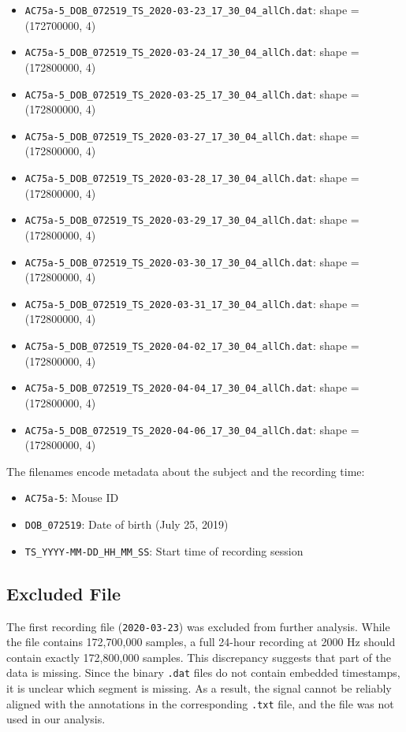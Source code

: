 \documentclass{article}
\begin{document}
	\begin{itemize}
		\item \texttt{AC75a-5\_DOB\_072519\_TS\_2020-03-23\_17\_30\_04\_allCh.dat}: shape = (172700000, 4)
		\item \texttt{AC75a-5\_DOB\_072519\_TS\_2020-03-24\_17\_30\_04\_allCh.dat}: shape = (172800000, 4)
		\item \texttt{AC75a-5\_DOB\_072519\_TS\_2020-03-25\_17\_30\_04\_allCh.dat}: shape = (172800000, 4)
		\item \texttt{AC75a-5\_DOB\_072519\_TS\_2020-03-27\_17\_30\_04\_allCh.dat}: shape = (172800000, 4)
		\item \texttt{AC75a-5\_DOB\_072519\_TS\_2020-03-28\_17\_30\_04\_allCh.dat}: shape = (172800000, 4)
		\item \texttt{AC75a-5\_DOB\_072519\_TS\_2020-03-29\_17\_30\_04\_allCh.dat}: shape = (172800000, 4)
		\item \texttt{AC75a-5\_DOB\_072519\_TS\_2020-03-30\_17\_30\_04\_allCh.dat}: shape = (172800000, 4)
		\item \texttt{AC75a-5\_DOB\_072519\_TS\_2020-03-31\_17\_30\_04\_allCh.dat}: shape = (172800000, 4)
		\item \texttt{AC75a-5\_DOB\_072519\_TS\_2020-04-02\_17\_30\_04\_allCh.dat}: shape = (172800000, 4)
		\item \texttt{AC75a-5\_DOB\_072519\_TS\_2020-04-04\_17\_30\_04\_allCh.dat}: shape = (172800000, 4)
		\item \texttt{AC75a-5\_DOB\_072519\_TS\_2020-04-06\_17\_30\_04\_allCh.dat}: shape = (172800000, 4)
	\end{itemize}
	
	
	The filenames encode metadata about the subject and the recording time:
	\begin{itemize}
		\item \texttt{AC75a-5}: Mouse ID
		\item \texttt{DOB\_072519}: Date of birth (July 25, 2019)
		\item \texttt{TS\_YYYY-MM-DD\_HH\_MM\_SS}: Start time of recording session
	\end{itemize}
	
	\subsection{Excluded File}
	
	The first recording file (\texttt{2020-03-23}) was excluded from further analysis. While the file contains 172{,}700{,}000 samples, a full 24-hour recording at 2000 Hz should contain exactly 172{,}800{,}000 samples. This discrepancy suggests that part of the data is missing. Since the binary \texttt{.dat} files do not contain embedded timestamps, it is unclear which segment is missing. As a result, the signal cannot be reliably aligned with the annotations in the corresponding \texttt{.txt} file, and the file was not used in our analysis.
	
\end{document}

